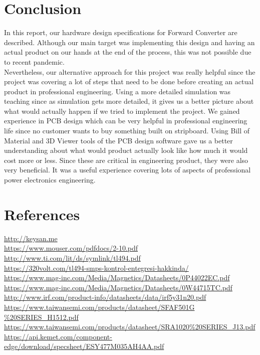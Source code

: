 \documentclass{article}
\newcommand\tab[1][1cm]{\hspace*{#1}}
\begin{document}
\section*{Conclusion}
\tab In this report, our hardware design specifications for Forward Converter are described. Although our main target was implementing this design and having an actual product on our hands at the end of the process, this was not possible due to recent pandemic. \\
\tab Nevertheless, our alternative approach for this project was really helpful since the project was covering a lot of steps that need to be done before creating an actual product in professional engineering. Using a more detailed simulation was teaching since as simulation gets more detailed, it gives us a better picture about what would actually happen if we tried to implement the project. We gained experience in PCB design which can be very helpful in professional engineering life since no customer wants to buy something built on stripboard. Using Bill of Material and 3D Viewer tools of the PCB design software gave us a better understanding about what would product actually look like how much it would cost more or less. Since these are critical in engineering product, they were also very beneficial. It was a useful experience covering lots of aspects of professional power electronics engineering.

\newpage
\section*{References}
\href{http://keysan.me}{http://keysan.me} \\
\href{https://www.mouser.com/pdfdocs/2-10.pdfhttps://www.mouser.com/pdfdocs/2-10.pdf}{https://www.mouser.com/pdfdocs/2-10.pdf} \\
\href{http://www.ti.com/lit/ds/symlink/tl494.pdf}{http://www.ti.com/lit/ds/symlink/tl494.pdf} \\
\href{https://320volt.com/tl494-smps-kontrol-entegresi-hakkinda/}{https://320volt.com/tl494-smps-kontrol-entegresi-hakkinda/} \\
\href{https://www.mag-inc.com/Media/Magnetics/Datasheets/0P44022EC.pdf}{https://www.mag-inc.com/Media/Magnetics/Datasheets/0P44022EC.pdf} \\
\href{https://www.mag-inc.com/Media/Magnetics/Datasheets/0W44715TC.pdf}{https://www.mag-inc.com/Media/Magnetics/Datasheets/0W44715TC.pdf} \\
\href{http://www.irf.com/product-info/datasheets/data/irf5y31n20.pdfhttp://www.irf.com/product-info/datasheets/data/irf5y31n20.pdf}{http://www.irf.com/product-info/datasheets/data/irf5y31n20.pdf} \\
\href{https://www.taiwansemi.com/products/datasheet/SFAF501G \%20SERIES_H1512.pdf}{https://www.taiwansemi.com/products/datasheet/SFAF501G \%20SERIES_H1512.pdf} \\
\href{https://www.taiwansemi.com/products/datasheet/SRA1020\%20SERIES_J13.pdf}{https://www.taiwansemi.com/products/datasheet/SRA1020\%20SERIES_J13.pdf} \\
\href{https://api.kemet.com/component-edge/download/specsheet/ESY477M035AH4AA.pdf}{https://api.kemet.com/component-edge/download/specsheet/ESY477M035AH4AA.pdf} \\
\end{document}
